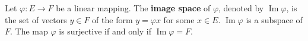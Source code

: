 Let $\varphi: E \to F$ be a linear mapping. The \textbf{image space} of $\varphi$, denoted by $\operatorname{Im} \varphi$, is the set of vectors $y \in F$ of the form $y = \varphi x$ for some $x \in E$. $\operatorname{Im} \varphi$ is a subspace of $F$. The map $\varphi$ is surjective if and only if $\operatorname{Im} \varphi = F$.
